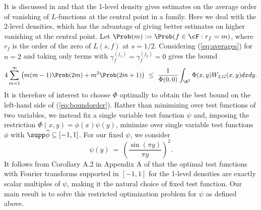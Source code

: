 \documentclass[12pt, reqno]{amsart}
\numberwithin{equation}{section}
\theoremstyle{definition}
\theoremstyle{remark}
\begin{document}
It is discussed in \cite{FreemanMiller} and \cite{ILS} that the 1-level density gives estimates on the average order of vanishing of $L$-functions at the central point in a family. Here we deal with the 2-level densities, which has the advantage of giving better estimates on higher vanishing at the central point. Let $\Prob (m) := \Prob (f \in \cF : r_f = m)$, where $r_f$ is the order of the zero of $L(s, f)$ at $s = 1/2$. Considering (\ref{eq:averages}) for $n = 2$ and taking only terms with $\gamma_f^{(j_1)} = \gamma_f^{(j_2)} = 0$ gives the bound
\begin{align}
    4\sum_{m = 1}^\infty \left(m (m - 1) \Prob (2m) + m^2 \Prob(2m + 1) \right) \ \leq \ \frac{1}{\Phi(0,0)} \int_{\R^2} \Phi(x, y) W_{2, G} (x, y) dx dy. \label{eq:boundorder}
\end{align}
It is therefore of interest to choose $\Phi$ optimally to obtain the best bound on the left-hand side of (\ref{eq:boundorder}). Rather than minimizing over test functions of two variables, we instead fix a single variable test function $\psi$ and, imposing the restriction $\Phi(x, y) = \phi(x) \psi (y)$, minimize over single variable test functions $\phi$ with $\supp \widehat \phi \subseteq [-1, 1]$. For our fixed $\psi$, we consider
	\begin{equation}
		\psi(y) \ = \  \left( \frac{\sin (\pi y)}{\pi y} \right)^2.\label{eq:fixedtest}
	\end{equation}	
It follows from Corollary A.2 in Appendix A of \cite{ILS} that the optimal test functions with Fourier transforms supported in $[-1, 1]$ for the 1-level densities are exactly scalar multiples of $\psi$, making it the natural choice of fixed test function. Our main result is to solve this restricted optimization problem for $\psi$ as defined above.
\end{document}
